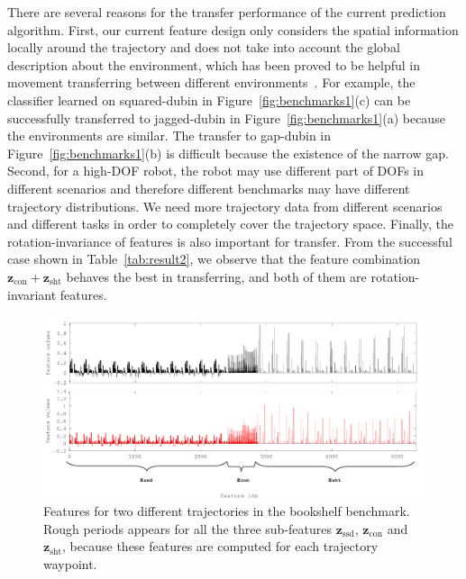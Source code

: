 \documentclass[letterpaper, 10 pt, conference]{ieeeconf}  %
\newcommand{\fssd}{\mbox{$\mathbf z_{\text{ssd}}$}}
\newcommand{\fcon}{\mbox{$\mathbf z_{\text{con}}$}}
\newcommand{\fsht}{\mbox{$\mathbf z_{\text{sht}}$}}
\begin{document}
There are several reasons for the transfer performance of the current prediction algorithm. First, our current feature design only considers the spatial information locally around the trajectory and does not take into account the global description about the environment, which has been proved to be helpful in movement transferring between different environments~\cite{Jetchev:2013:FMP}. For example, the classifier learned on squared-dubin in Figure~\ref{fig:benchmarks1}(c) can be successfully transferred to jagged-dubin in Figure~\ref{fig:benchmarks1}(a) because the environments are similar. The transfer to gap-dubin in Figure~\ref{fig:benchmarks1}(b) is difficult because the existence of the narrow gap. Second, for a high-DOF robot, the robot may use different part of DOFs in different scenarios and therefore different benchmarks may have different trajectory distributions. We need more trajectory data from different scenarios and different tasks in order to completely cover the trajectory space. Finally, the rotation-invariance of features is also important for transfer. From the successful case shown in Table~\ref{tab:result2}, we observe that the feature combination $\fcon+\fsht$ behaves the best in transferring, and both of them are rotation-invariant features. 

\begin{figure}[t]
\centering
\includegraphics[width=\linewidth]{figure/features.pdf}
\caption{Features for two different trajectories in the bookshelf benchmark. Rough periods appears for all the three sub-features $\fssd$, $\fcon$ and $\fsht$, because these features are computed for each trajectory waypoint.}
\label{fig:features}
\end{figure}
\end{document}
